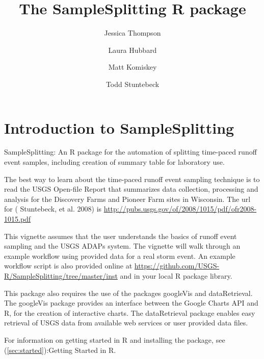 \documentclass[a4paper,11pt]{article}\usepackage[]{graphicx}\usepackage[]{color}
\begin{document}
\title{The SampleSplitting R package}
\author[1]{Jessica Thompson}
\author[1]{Laura Hubbard}
\author[1]{Matt Komiskey}
\author[1]{Todd Stuntebeck}





\maketitle
\tableofcontents

\section{Introduction to SampleSplitting}

SampleSplitting: An R package for the automation of splitting time-paced runoff event samples, including creation of summary table for laboratory use.

The best way to learn about the time-paced runoff event sampling technique is to read the USGS Open-file Report that summarizes data collection, processing and analysis for the Discovery Farms and Pioneer Farm sites in Wisconsin. The url for (\cite{Stuntebeck} Stuntebeck, et al. 2008) is 
\url{http://pubs.usgs.gov/of/2008/1015/pdf/ofr2008-1015.pdf}

This vignette assumes that the user understands the basics of runoff event sampling and the USGS ADAPs system. The vignette will walk through an example workflow using provided data for a real storm event. An example workflow script is also provided online at \url {https://github.com/USGS-R/SampleSplitting/tree/master/inst} and in your local R package library.

This package also requires the use of the packages googleVis and dataRetrieval. The googleVis package provides an interface between the Google Charts API and R, for the creation of interactive charts. The dataRetrieval package enables easy retrieval of USGS data from available web services or user provided data files.

For information on getting started in R and installing the package, see (\ref{sec:started}):Getting Started in R. 

\end{document}
